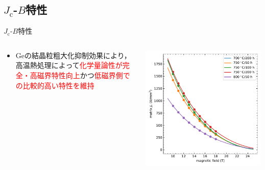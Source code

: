 \documentclass[aspectratio=169, unicode, 10pt]{beamer}
\begin{document}
	\subsection{$J_\mathrm{c}$-$B$特性}
	\begin{frame}{$J_\mathrm{c}$-$B$特性}
		\begin{columns}
			\begin{column}{0.45\linewidth}
				\begin{itemize}
					\item Geの結晶粒粗大化抑制効果により，高温熱処理によって\textcolor{red}{化学量論性が完全・高磁界特性向上}かつ\textcolor{red}{低磁界側での比較的高い特性を維持}
				\end{itemize}
			\end{column}
			\begin{column}{0.55\linewidth}
				\centering
				\includegraphics[width=0.9\linewidth]{figs/jcout.pdf}
				
			\end{column}
		\end{columns}

	\end{frame}
\end{document}

